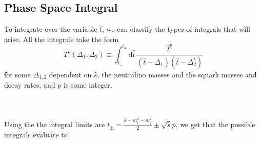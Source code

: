 \documentclass[../main.tex]{subfiles}
\begin{document}
\subsection{Phase Space Integral}
To integrate over the variable \(\hat{t}\), we can classify the types of
integrals that will arise. All the integrals take the form
\begin{equation}
	T^p(\Delta_1, \Delta_2) \equiv \int_{t_-}^{t_+} \!\mathrm{d}\hat{t}\, \frac{\hat{t}^p}{(\hat{t}-\Delta_1)(\hat{t}-\Delta_2^\ast)}
\end{equation}
for some \(\Delta_{1,2}\) dependent on \(\hat{s}\), the neutralino masses and the squark masses and decay rates, and \(p\) is some integer.

\\
\\
Using the the integral limits are \(t_\pm = \frac{\hat{s} - m_i^2 - m_j^2}{2} \pm \sqrt{\hat{s}}p\), we get that the possible integrals evaluate to
\end{document}
